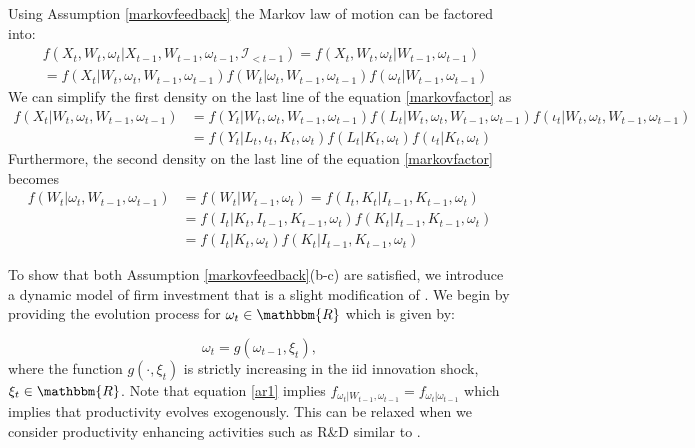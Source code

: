 \documentclass{article}
\begin{document}
Using Assumption \eqref{markovfeedback} the Markov law of motion can be factored into:
\begin{equation} \label{markovfactor}
    \begin{split}
        &f(X_{t}, W_{t}, \omega_{t}|X_{t-1}, W_{t-1}, \omega_{t-1}, \mathcal{I}_{<t-1})=f(X_{t}, W_{t}, \omega_{t}|W_{t-1}, \omega_{t-1})\\
        &=f(X_{t}|W_{t}, \omega_{t}, W_{t-1}, \omega_{t-1})f(W_{t}|\omega_{t}, W_{t-1}, \omega_{t-1})f(\omega_{t}|W_{t-1}, \omega_{t-1})
    \end{split}
\end{equation} 
We can simplify the first density on the last line of the equation \eqref{markovfactor} as
\begin{equation} \label{1stdensity}
\begin{split}
f(X_{t}|W_{t}, \omega_{t}, W_{t-1}, \omega_{t-1})&=f(Y_{t}|W_{t}, \omega_{t}, W_{t-1}, \omega_{t-1})f(L_{t}|W_{t}, \omega_{t}, W_{t-1}, \omega_{t-1})f(\iota_{t}|W_{t}, \omega_{t}, W_{t-1}, \omega_{t-1})\\
&=f(Y_{t}|L_{t}, \iota_{t}, K_{t}, \omega_{t})f(L_{t}|K_{t}, \omega_{t})f(\iota_{t}|K_{t}, \omega_{t})
\end{split}
\end{equation}
Furthermore, the second density on the last line of the equation \eqref{markovfactor} becomes
\begin{equation} \label{2nddensity}
    \begin{split}
        f(W_{t}|\omega_{t}, W_{t-1}, \omega_{t-1})&=f(W_{t}|W_{t-1}, \omega_{t})=f(I_{t}, K_{t}|I_{t-1}, K_{t-1}, \omega_{t})\\
        &=f(I_{t}|K_{t}, I_{t-1}, K_{t-1}, \omega_{t})f(K_{t}|I_{t-1}, K_{t-1}, \omega_{t})\\
        &=f(I_{t}|K_{t}, \omega_{t})f(K_{t}|I_{t-1}, K_{t-1}, \omega_{t})
    \end{split}
\end{equation} 

To show that both Assumption \eqref{markovfeedback}(b-c) are satisfied, we introduce a dynamic model of firm investment that is a slight modification of \cite{Ericson1995}. We begin by providing the evolution process for $\omega_{t}\in \mathbbm{R}$ which is given by:

\begin{equation} \label{ar1}
\omega_{t}=g(\omega_{t-1}, \xi_{t}),
\end{equation}
where the function $g(\cdot, \xi_{t})$ is strictly increasing in the iid innovation shock, $\xi_{t}\in \mathbbm{R}$. Note that equation \eqref{ar1} implies $f_{\omega_{t}|W_{t-1}, \omega_{t-1}}=f_{\omega_{t}|\omega_{t-1}}$ which implies that productivity evolves exogenously. This can be relaxed when we consider productivity enhancing activities such as R\&D similar to \cite{Doraszelski2013}.\\
\end{document}
